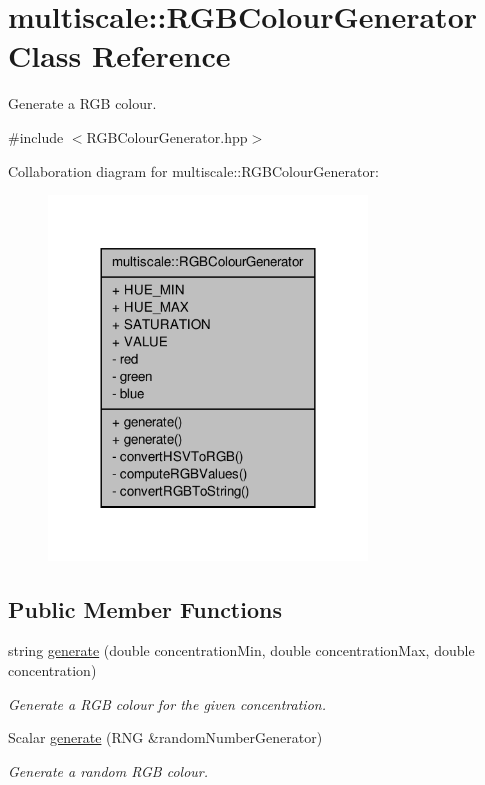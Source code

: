 \hypertarget{classmultiscale_1_1RGBColourGenerator}{\section{multiscale\-:\-:R\-G\-B\-Colour\-Generator Class Reference}
\label{classmultiscale_1_1RGBColourGenerator}
}


Generate a R\-G\-B colour.  




{\ttfamily \#include $<$R\-G\-B\-Colour\-Generator.\-hpp$>$}



Collaboration diagram for multiscale\-:\-:R\-G\-B\-Colour\-Generator\-:
\nopagebreak
\begin{figure}[H]
\begin{center}
\leavevmode
\includegraphics[width=240pt]{classmultiscale_1_1RGBColourGenerator__coll__graph}
\end{center}
\end{figure}
\subsection*{Public Member Functions}
\begin{DoxyCompactItemize}
\item 
string \hyperlink{classmultiscale_1_1RGBColourGenerator_ab96622fb17f93d1f92a3b8b9fd978725}{generate} (double concentration\-Min, double concentration\-Max, double concentration)
\begin{DoxyCompactList}\small\item\em Generate a R\-G\-B colour for the given concentration. \end{DoxyCompactList}\item 
Scalar \hyperlink{classmultiscale_1_1RGBColourGenerator_a9eadd001d970bdb3c4237ab3a1b6683a}{generate} (R\-N\-G \&random\-Number\-Generator)
\begin{DoxyCompactList}\small\item\em Generate a random R\-G\-B colour. \end{DoxyCompactList}\end{DoxyCompactItemize}
